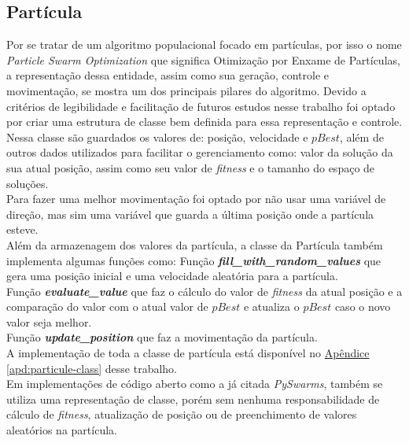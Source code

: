\subsection{Partícula}
Por se tratar de um algoritmo populacional focado em partículas, por isso o nome \textit{Particle Swarm Optimization} que significa Otimização por Enxame de Partículas, a representação dessa entidade, assim como sua geração, controle e movimentação, se mostra um dos principais pilares do algoritmo. Devido a critérios de legibilidade e facilitação de futuros estudos nesse trabalho foi optado por criar uma estrutura de classe bem definida para essa representação e controle.
Nessa classe são guardados os valores de: posição, velocidade e $pBest$, além de outros dados utilizados para facilitar o gerenciamento como: valor da solução da sua atual posição, assim como seu valor de \textit{fitness} e o tamanho do espaço de soluções.\\
\indent Para fazer uma melhor movimentação foi optado por não usar uma variável de direção, mas sim uma variável que guarda a última posição onde a partícula esteve.\\
Além da armazenagem dos valores da partícula, a classe da Partícula também implementa algumas funções como:
Função \textbf{\textit{fill\_with\_random\_values}} que gera uma posição inicial e uma velocidade aleatória para a partícula.\\
Função \textbf{\textit{evaluate\_value}} que faz o cálculo do valor de \textit{fitness} da atual posição e a comparação do valor com o atual valor de $pBest$ e atualiza o $pBest$ caso o novo valor seja melhor.\\
Função \textbf{\textit{update\_position}} que faz a movimentação da partícula.\\
\noindent A implementação de toda a classe de partícula está disponível no 
\hyperref[apd:particule-class]{Apêndice \ref{apd:particule-class}}
desse trabalho.\\
%
\indent Em implementações de código aberto como a já citada \textit{PySwarms}, também se utiliza uma representação de classe, porém sem nenhuma responsabilidade de cálculo de \textit{fitness}, atualização de posição ou de preenchimento de valores aleatórios na partícula.\\
